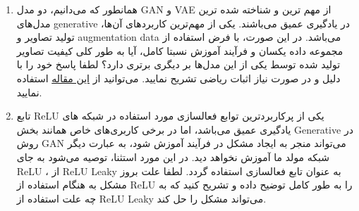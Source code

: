 \begin{enumerate}[label=(\alph*)]
	\item
	همانطور که می‌دانیم، دو مدل GAN و VAE از مهم ترین و شناخته شده ترین مدل‌های generative در یادگیری عمیق می‌باشند. یکی از مهم‌ترین کاربردهای آن‌ها، تولید تصاویر و augmentation data می‌باشد. در این صورت، با فرض استفاده از مجموعه داده یکسان و فرآیند آموزش نسبتا کامل، آیا به طور کلی کیفیت تصاویر تولید شده توسط یکی از این مدل‌ها بر دیگری برتری دارد؟ لطفا پاسخ خود را با دلیل و در صورت نیاز اثبات ریاضی تشریح نمایید.
	می‌توانید از 
	\href{https://arxiv.org/pdf/1706.01807.pdf}{این مقاله}
	استفاده نمایید.
	\item
	تابع ReLU یکی از پرکاربردترین توابع فعالسازی مورد استفاده در شبکه های یادگیری عمیق می‌باشد، اما در برخی کاربری‌های خاص همانند بخش Generative در روش GAN می‌تواند منجر به ایجاد مشکل در فرآیند آموزش شود، به عبارت دیگر شبکه مولد ما آموزش نخواهد دید. در این مورد استثنا، توصیه می‌شود به جای ReLU ، از ReLU Leaky به عنوان تابع فعالسازی استفاده گردد. لطفا علت بروز مشکل به هنگام استفاده از ReLU را به طور کامل توضیح داده و تشریح کنید که به چه علت استفاده از ReLU Leaky می‌تواند مشکل را حل کند.
	 
\end{enumerate}
